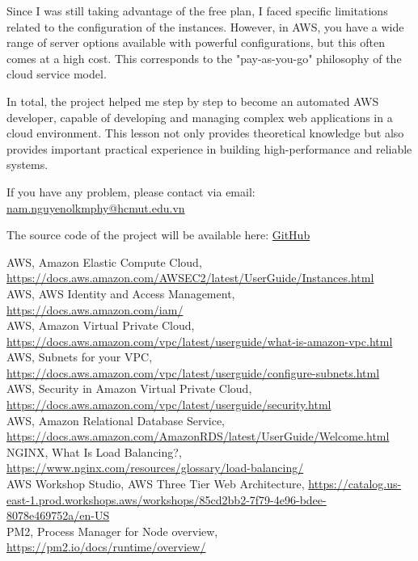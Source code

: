 \documentclass{article}
\begin{document}
Since I was still taking advantage of the free plan, I faced specific limitations related to the configuration of the instances. However, in AWS, you have a wide range of server options available with powerful configurations, but this often comes at a high cost. This corresponds to the "pay-as-you-go" philosophy of the cloud service model.\par

In total, the project helped me step by step to become an automated AWS developer, capable of developing and managing complex web applications in a cloud environment. This lesson not only provides theoretical knowledge but also provides important practical experience in building high-performance and reliable systems.\par

\vspace{10pt}
If you have any problem, please contact via email: \url{nam.nguyenolkmphy@hcmut.edu.vn}\par
The source code of the project will be available here: \href{https://github.com/knammm/Three-Tier-Web-Application}{GitHub}


\newpage


% 
\begin{thebibliography}{90}
\bibitem{} AWS, Amazon Elastic Compute Cloud, \url{https://docs.aws.amazon.com/AWSEC2/latest/UserGuide/Instances.html}\\
\bibitem{} AWS, AWS Identity and Access Management, \url{https://docs.aws.amazon.com/iam/} \\
\bibitem{} AWS, Amazon Virtual Private Cloud, \url{https://docs.aws.amazon.com/vpc/latest/userguide/what-is-amazon-vpc.html} \\
\bibitem{} AWS, Subnets for your VPC, \url{https://docs.aws.amazon.com/vpc/latest/userguide/configure-subnets.html}\\
\bibitem{} AWS, Security in Amazon Virtual Private Cloud, \url{https://docs.aws.amazon.com/vpc/latest/userguide/security.html} \\
\bibitem{} AWS, Amazon Relational Database Service, \url{https://docs.aws.amazon.com/AmazonRDS/latest/UserGuide/Welcome.html} \\
\bibitem{} NGINX, What Is Load Balancing?, \url{https://www.nginx.com/resources/glossary/load-balancing/} \\
\bibitem{} AWS Workshop Studio, AWS Three Tier Web Architecture, \url{https://catalog.us-east-1.prod.workshops.aws/workshops/85cd2bb2-7f79-4e96-bdee-8078e469752a/en-US} \\
\bibitem{} PM2, Process Manager for Node overview, \url{https://pm2.io/docs/runtime/overview/}





\end{thebibliography}

\nocite{*}
\end{document}
